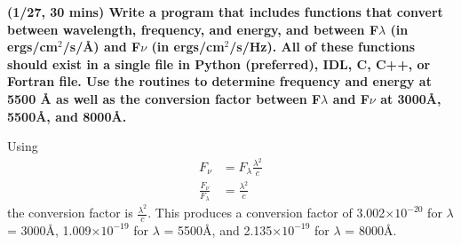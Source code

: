 \documentclass[12pt]{article}
\begin{document}
\textbf{(1/27, 30 mins) Write a program that includes functions
that convert between wavelength, frequency, and energy, and between
F$\scriptstyle \lambda$ (in ergs/cm$^2$/s/\AA{}) and F$\scriptstyle \nu$
(in ergs/cm$^2$/s/Hz). All of these functions should exist in a single
file in Python (preferred), IDL, C, C++, or Fortran file. Use the
routines to determine frequency and energy at 5500 \AA{} as well as the
conversion factor between F$\scriptstyle \lambda$ and F$\scriptstyle
\nu$ at 3000\AA{}, 5500\AA{}, and 8000\AA{}.}

Using
\begin{align*}
    F_{\nu} &= F_{\lambda}\frac{\lambda^2}{c} \\
    \frac{F_{\nu}}{F_{\lambda}} &= \frac{\lambda^2}{c}
\end{align*}
the conversion factor is $\frac{\lambda^2}{c}$. This produces a
conversion factor of
3.002$\times10^{-20}$ for $\lambda$ = 3000\AA{},
1.009$\times10^{-19}$ for $\lambda$ = 5500\AA{}, and
2.135$\times10^{-19}$ for $\lambda$ = 8000\AA{}.
\end{document}
